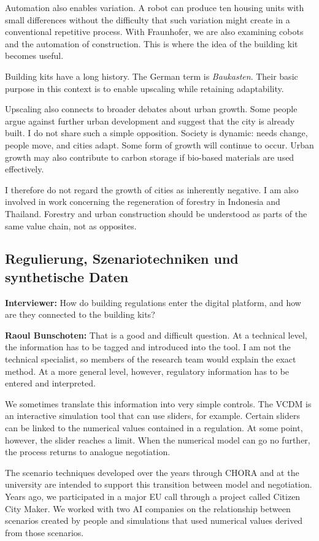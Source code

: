 Automation also enables variation. A robot can produce ten housing units with small differences without the difficulty that such variation might create in a conventional repetitive process. With Fraunhofer, we are also examining cobots and the automation of construction. This is where the idea of the building kit becomes useful.

Building kits have a long history. The German term is \textit{Baukasten}. Their basic purpose in this context is to enable upscaling while retaining adaptability.

Upscaling also connects to broader debates about urban growth. Some people argue against further urban development and suggest that the city is already built. I do not share such a simple opposition. Society is dynamic: needs change, people move, and cities adapt. Some form of growth will continue to occur. Urban growth may also contribute to carbon storage if bio-based materials are used effectively.

I therefore do not regard the growth of cities as inherently negative. I am also involved in work concerning the regeneration of forestry in Indonesia and Thailand. Forestry and urban construction should be understood as parts of the same value chain, not as opposites.

\subsection{Regulierung, Szenariotechniken und synthetische Daten}

\textbf{Interviewer:} How do building regulations enter the digital platform, and how are they connected to the building kits?

\textbf{Raoul Bunschoten:} That is a good and difficult question. At a technical level, the information has to be tagged and introduced into the tool. I am not the technical specialist, so members of the research team would explain the exact method. At a more general level, however, regulatory information has to be entered and interpreted.

We sometimes translate this information into very simple controls. The VCDM is an interactive simulation tool that can use sliders, for example. Certain sliders can be linked to the numerical values contained in a regulation. At some point, however, the slider reaches a limit. When the numerical model can go no further, the process returns to analogue negotiation.

The scenario techniques developed over the years through CHORA and at the university are intended to support this transition between model and negotiation. Years ago, we participated in a major EU call through a project called Citizen City Maker. We worked with two AI companies on the relationship between scenarios created by people and simulations that used numerical values derived from those scenarios.

